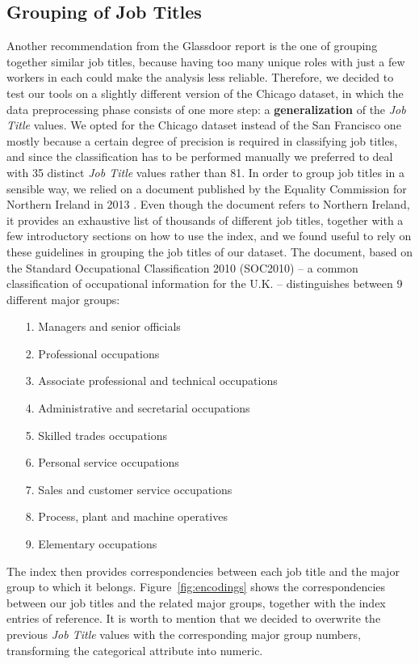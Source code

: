 \subsection{Grouping of Job Titles}
\label{section:grouping_job_titles}
Another recommendation from the Glassdoor report \cite{chamberlain2017analyze} is the one of grouping together similar job titles, because having too many unique roles with just a few workers in each could make the analysis less reliable. Therefore, we decided to test our tools on a slightly different version of the Chicago dataset, in which the data preprocessing phase consists of one more step: a \textbf{generalization} of the \textit{Job Title} values. We opted for the Chicago dataset instead of the San Francisco one mostly because a certain degree of precision is required in classifying job titles, and since the classification has to be performed manually we preferred to deal with 35 distinct \textit{Job Title} values rather than 81. In order to group job titles in a sensible way, we relied on a document published by the Equality Commission for Northern Ireland in 2013 \cite{equality2013index}. Even though the document refers to Northern Ireland, it provides an exhaustive list of thousands of different job titles, together with a few introductory sections on how to use the index, and we found useful to rely on these guidelines in grouping the job titles of our dataset. The document, based on the Standard Occupational Classification 2010 (SOC2010) -- a common classification of occupational information for the U.K. -- distinguishes between 9 different major groups:
\begin{itemize}
\item[1.] Managers and senior officials
\item[2.] Professional occupations
\item[3.] Associate professional and technical occupations
\item[4.] Administrative and secretarial occupations
\item[5.] Skilled trades occupations
\item[6.] Personal service occupations
\item[7.] Sales and customer service occupations
\item[8.] Process, plant and machine operatives
\item[9.] Elementary occupations
\end{itemize}
The index then provides correspondencies between each job title and the major group to which it belongs. Figure~\ref{fig:encodings} shows the correspondencies between our job titles and the related major groups, together with the index entries of reference. It is worth to mention that we decided to overwrite the previous \textit{Job Title} values with the corresponding major group numbers, transforming the categorical attribute into numeric.

